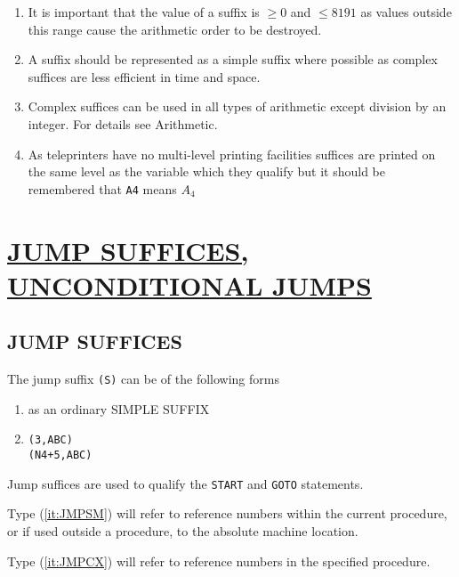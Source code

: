 \documentclass[10pt, a4paper, oneside]{article}
\newcommand{\myuline}[1]{\uline{#1}}
\newcommand{\mytt}[1]{\texttt{\scriptsize #1}}
\newcommand{\mytt}[1]{\texttt{\small #1}}
\begin{document}
\begin{multicols}{2}
\begin{enumerate}
\item It is important that the value of a suffix is $\geqslant 0$
and $\leqslant 8191$ as values outside this range cause the arithmetic order to be destroyed.

\item A suffix should be represented as a simple suffix
where possible as complex suffices are less efficient
in time and space.

\item Complex suffices can be used in all types of
arithmetic except division by an integer.  For details
see Arithmetic.

\item As teleprinters have no multi-level printing
facilities suffices are printed on the same level as
the variable which they qualify but it should be
remembered that \mytt{A4} means $A_{4}$

\end{enumerate}


\section{\myuline{JUMP SUFFICES,} \myuline{UNCONDITIONAL JUMPS}}

\subsection{JUMP SUFFICES}

The jump suffix \mytt{(\rlap{/}S)} can be of the following forms

\renewcommand{\labelenumi}{(\roman{enumi})}
\begin{enumerate}
\def\theenumi{\roman{enumi}}
\item\label{it:JMPSM} as an ordinary SIMPLE SUFFIX
\item\label{it:JMPCX} \begin{addmargin}[1cm]{1em}%
\begin{lstlisting}
(3,ABC)
(N4+5,ABC)
\end{lstlisting}
\end{addmargin}
\end{enumerate}

Jump suffices are used to qualify the \mytt{START} and
\mytt{GOTO} statements.

Type (\ref{it:JMPSM}) will refer to reference numbers within the
current procedure, or if used outside a procedure, to
the absolute machine location.

Type (\ref{it:JMPCX}) will refer to reference numbers in the
specified procedure.


\end{multicols}
\end{document}
